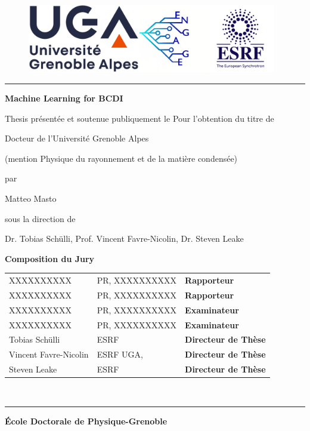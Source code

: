 \documentclass[12pt]{book}
\begin{document}
\begin{titlepage}
	
\begin{figure}
     \center
    \includegraphics[height=3cm]{figures/logos/full_logo.png}
\end{figure}
\hrule
		
\vfill

\begin{center}	
	{
        \Large \bfseries Machine Learning for BCDI
    }
\end{center}	
		
\vfill
\begin{center}	
	{\Huge  Thesis}
	\vfill
	présentée et soutenue publiquement le %
	\vfill
	Pour l'obtention du titre de 
	\vfill
	
	{\Large Docteur de l'Université Grenoble Alpes}
	
	(mention Physique du rayonnement et de la matière condensée)
	
	\vfill
	par 
	
	Matteo Masto
	
\vfill
sous la direction de 

Dr. Tobias Sch\"ulli, Prof. Vincent Favre-Nicolin, Dr. Steven Leake
	
\end{center}


\vspace{1cm}
			
{\bfseries Composition du Jury}		
\begin{center}
	\begin{tabular}{lll}
		
		XXXXXXXXXX &  PR, XXXXXXXXXX & \textbf{Rapporteur}\\
		
		XXXXXXXXXX  &  PR, XXXXXXXXXX & \textbf{Rapporteur} \\
		
		XXXXXXXXXX & PR, XXXXXXXXXX & \textbf{Examinateur} \\
		
		XXXXXXXXXX & PR, XXXXXXXXXX & \textbf{Examinateur} \\
		
		Tobias Sch\"ulli &  ESRF & \textbf{Directeur de Thèse}\\
		Vincent Favre-Nicolin &  ESRF UGA, & \textbf{Directeur de Thèse}\\
		Steven Leake &  ESRF & \textbf{Directeur de Thèse}

	\end{tabular}\\[1cm]
\end{center}
\hrule

{\small \bfseries
École Doctorale de Physique-Grenoble}

\newpage
\end{titlepage}
\end{document}
